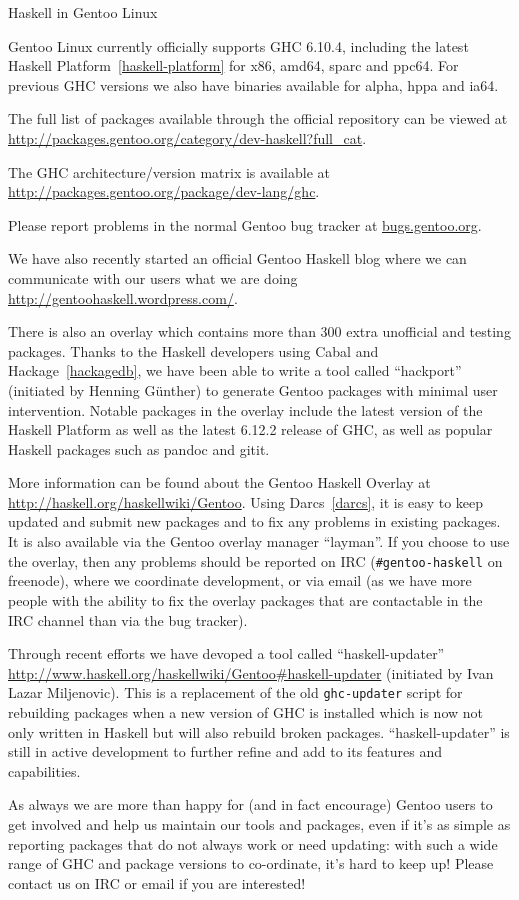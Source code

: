 \begin{hcarentry}[updated]{Haskell in Gentoo Linux}
\label{gentoo}
\makeheader

Gentoo Linux currently officially supports GHC 6.10.4, including the
latest Haskell Platform~\cref{haskell-platform} for x86, amd64, sparc
and ppc64.  For previous GHC versions we also have binaries available
for alpha, hppa and ia64.

The full list of packages available through the official repository
can be viewed at
\url{http://packages.gentoo.org/category/dev-haskell?full\_cat}.

The GHC architecture/version matrix is available at
\url{http://packages.gentoo.org/package/dev-lang/ghc}.

Please report problems in the normal Gentoo bug tracker
at \url{bugs.gentoo.org}.

We have also recently started an official Gentoo Haskell blog where we
can communicate with our users what we are doing
\url{http://gentoohaskell.wordpress.com/}.

There is also an overlay which contains more than 300 extra unofficial
and testing packages. Thanks to the Haskell developers using Cabal and
Hackage~\cref{hackagedb}, we have been able to write a tool called
``hackport'' (initiated by Henning G\"unther) to generate Gentoo
packages with minimal user intervention.  Notable packages in the
overlay include the latest version of the Haskell Platform as well as
the latest 6.12.2 release of GHC, as well as popular Haskell packages
such as pandoc and gitit.

More information can be found about the Gentoo Haskell Overlay at
\url{http://haskell.org/haskellwiki/Gentoo}. Using Darcs~\cref{darcs},
it is easy to keep updated and submit new packages and to fix any
problems in existing packages.  It is also available via the Gentoo
overlay manager ``layman''.  If you choose to use the overlay, then
any problems should be reported on IRC (\verb+#gentoo-haskell+ on
freenode), where we coordinate development, or via email
 (as we have more people with the ability to
fix the overlay packages that are contactable in the IRC channel than
via the bug tracker).

Through recent efforts we have devoped a tool called
``haskell-updater''
\url{http://www.haskell.org/haskellwiki/Gentoo#haskell-updater}
(initiated by Ivan Lazar Miljenovic).  This is a replacement of the
old \verb+ghc-updater+ script for rebuilding packages when a new
version of GHC is installed which is now not only written in Haskell
but will also rebuild broken packages.  ``haskell-updater'' is still
in active development to further refine and add to its features and
capabilities.

As always we are more than happy for (and in fact encourage) Gentoo
users to get involved and help us maintain our tools and packages,
even if it's as simple as reporting packages that do not always work
or need updating: with such a wide range of GHC and package versions
to co-ordinate, it's hard to keep up!  Please contact us on IRC or
email if you are interested!
\end{hcarentry}
